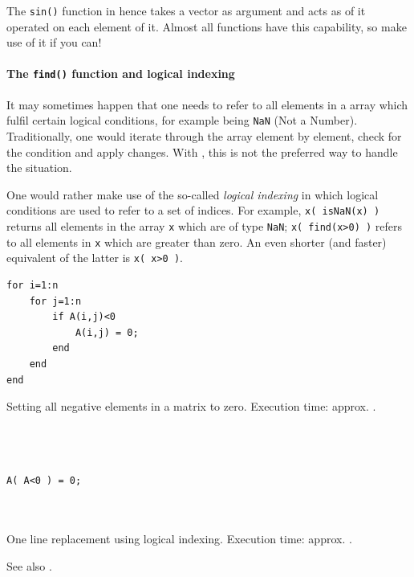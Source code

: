 The \lstinline!sin()! function in \matlab{} hence takes a vector as argument and acts as of it operated on each element of it. Almost all \matlab{} functions have this capability, so make use of it if you can!


\paragraph{The \lstinline!find()! function and logical indexing}

It may sometimes happen that one needs to refer to all elements in a \matlab{} array which fulfil certain logical conditions, for example being \lstinline!NaN! (Not a Number). Traditionally, one would iterate through the array element by element, check for the condition and apply changes. With \matlab{}, this is not the preferred way to handle the situation.

One would rather make use of the so-called \emph{logical indexing} in which logical conditions are used to refer to a set of indices. For example, \lstinline!x( isNaN(x) )! returns all elements in the array \lstinline!x! which are of type \lstinline!NaN!; \lstinline!x( find(x>0) )! refers to all elements in \lstinline!x! which are greater than zero. An even shorter (and faster) equivalent of the latter is \lstinline!x( x>0 )!.

\hfill
\begin{minipage}[t]{.45\textwidth}
\begin{lstlisting}[framerule=2pt,rulecolor=\color{badred}]
for i=1:n
    for j=1:n
        if A(i,j)<0
            A(i,j) = 0;
        end
    end
end
\end{lstlisting}
Setting all negative elements in a matrix to zero.  Execution time: approx. .
\end{minipage}
\hfill
\begin{minipage}[t]{.45\textwidth}
\begin{lstlisting}[framerule=2pt,rulecolor=\color{goodgreen}]



A( A<0 ) = 0;



\end{lstlisting}
One line replacement using logical indexing.  Execution time: approx. .
\end{minipage}
\hfill

See also \cite{Mathworks:2001:MIM}.


